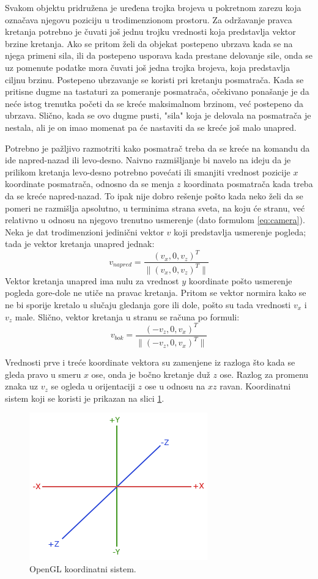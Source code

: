 \documentclass[12pt,oneside]{memoir}
\begin{document}
Svakom objektu pridružena je  uređena trojka brojeva u pokretnom zarezu koja označava njegovu poziciju u trodimenzionom prostoru.
Za održavanje pravca kretanja potrebno je čuvati još jednu trojku vrednosti koja predstavlja vektor brzine kretanja.
Ako se pritom želi da objekat postepeno ubrzava kada se na njega primeni sila, ili da postepeno usporava 
kada prestane delovanje sile, onda se uz pomenute podatke mora čuvati još jedna trojka brojeva, koja predstavlja ciljnu brzinu.
Postepeno ubrzavanje se koristi pri kretanju posmatrača. 
Kada se pritisne dugme na tastaturi za pomeranje posmatrača, očekivano ponašanje je da neće istog trenutka 
početi da se kreće maksimalnom brzinom, već postepeno da ubrzava.
Slično, kada se ovo dugme pusti, "sila" koja je delovala na posmatrača je nestala, ali je on imao momenat pa će
nastaviti da se kreće još malo unapred.

Potrebno je pažljivo razmotriti kako posmatrač treba da se kreće na komandu da ide napred-nazad ili levo-desno.
Naivno razmišljanje bi navelo na ideju da je prilikom kretanja levo-desno potrebno povećati ili smanjiti vrednost pozicije $x$ koordinate posmatrača,
odnosno da se menja $z$ koordinata posmatrača kada treba da se kreće napred-nazad.
To ipak nije dobro rešenje pošto kada neko želi da se pomeri ne razmišlja apsolutno, u terminima strana sveta, na koju će stranu, 
već relativno u odnosu na njegovo trenutno usmerenje (dato formulom \ref{eq:camera}).
Neka je dat trodimenzioni jedinični vektor $v$ koji predstavlja usmerenje pogleda; tada je vektor 
kretanja unapred jednak: 
$$ v_{napred} = \frac{(v_x, 0, v_z)^T}{\|(v_x, 0, v_z)^T\|} $$
Vektor kretanja unapred ima nulu za vrednost $y$ koordinate pošto usmerenje pogleda gore-dole ne utiče na pravac kretanja.
Pritom se vektor normira kako se ne bi sporije kretalo u slučaju gledanja gore ili dole, 
pošto su tada vrednosti $v_x$ i $v_z$ male.
Slično, vektor kretanja u stranu se računa po formuli:
$$ v_{bok} = \frac{(-v_z, 0, v_x)^T}{\|(-v_z, 0, v_x)^T\|} $$

Vrednosti prve i treće koordinate vektora su zamenjene iz razloga što kada se gleda pravo u smeru $x$ ose, 
onda je bočno kretanje duž $z$ ose. Razlog za promenu znaka uz $v_z$ se ogleda u orijentaciji $z$ ose u odnosu na $xz$ ravan.
Koordinatni sistem koji se koristi je prikazan na slici \ref{fig:coord}.

\begin{figure}[h!]
	\centerfloat
	\includegraphics[scale=0.75]{coord.png}
	\caption{OpenGL koordinatni sistem.}
	\label{fig:coord}
\end{figure}
\end{document}
